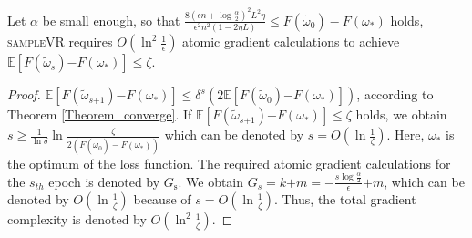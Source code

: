 \documentclass[letterpaper]{article}
\begin{document}





\begin{Theorem}
\label{theorem_gradient_complexity}
Let $\alpha$ be small enough, so that $\frac{8(\epsilon n+\log\frac{\alpha}{2})^2L^2\eta}{\epsilon^2n^2(1-2\eta L)}\le F(\tilde{\omega}_0) - F(\omega_\ast)$ holds, \textsc{sampleVR} requires $O(\ln^2\frac{1}{\epsilon})$ atomic gradient calculations  to achieve $\mathbb{E}[F(\tilde{\omega}_s)\mathrm{-}F(\omega_\ast)] \le \zeta$.
\end{Theorem}
\begin{proof}
$\mathbb{E}[F(\tilde{\omega}_{s\mathrm{+}1}) \mathrm{-} F(\omega_\ast)]  \le \delta^s \left(2\mathbb{E}[F(\tilde{\omega}_0)\mathrm{-}F(\omega_\ast)]\right)$, according to Theorem \ref{Theorem_converge}. If $\mathbb{E}[F(\tilde{\omega}_{s\mathrm{+}1}) \mathrm{-} F(\omega_\ast)]  \le \zeta$ holds, we obtain $s\ge\frac{1}{\ln \delta}\ln \frac{\zeta}{2(F(\tilde{\omega}_0)-F(\omega_\ast))}$ which can be denoted by $s=O(\ln \frac{1}{\zeta})$. Here, $\omega_\ast$ is the optimum of the loss function. The required atomic gradient calculations for the $s_{th}$ epoch is denoted by $G_\mathrm{s}$. We obtain $G_s = k \mathrm{+}m = \mathrm{-} \frac{s\log\frac{\alpha}{2}}{\epsilon}\mathrm{+}m$, which can be denoted by $O(\ln\frac{1}{\zeta})$ because of $s=O(\ln \frac{1}{\zeta})$. Thus, the total  gradient complexity is  denoted by 
$O(\ln^2\frac{1}{\zeta})$. 
\end{proof}
\end{document}
